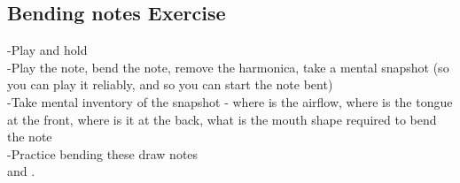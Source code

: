 \subsection{Bending notes Exercise}
    -Play and hold        \\
    -Play the note, bend the note, remove the harmonica, take a mental snapshot (so you can play it reliably, and so you can start the note bent) \\
    -Take mental inventory of the snapshot - where is the airflow, where is the tongue at the front, where is it at the back, what is the mouth shape required to bend the note\\
    -Practice bending these draw notes \\
    \1 \2 \3 \4 and \6.